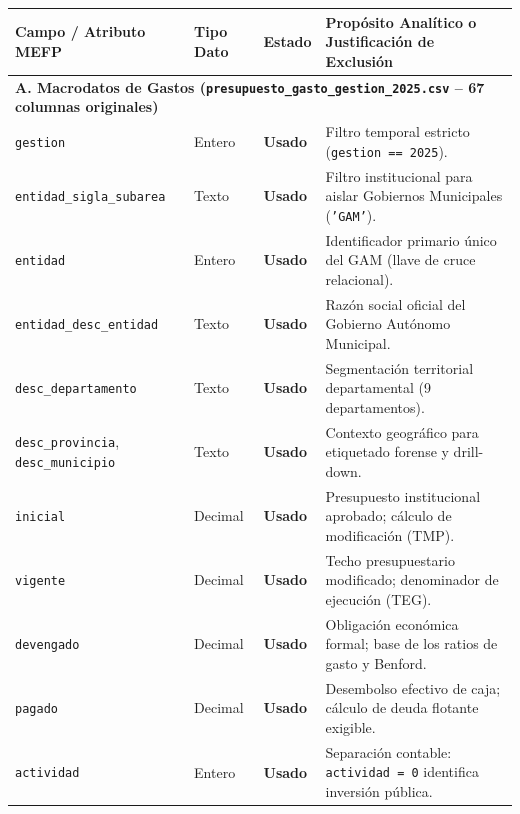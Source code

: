 
\begin{table}[H]
\centering
\scriptsize
\begin{tabularx}{\textwidth}{p{3.2cm}p{1.6cm}p{1.4cm}>{\raggedright\arraybackslash}X}
\toprule
\textbf{Campo / Atributo MEFP} & \textbf{Tipo Dato} & \textbf{Estado} & \textbf{Propósito Analítico o Justificación de Exclusión} \\
\midrule
\multicolumn{4}{l}{\textbf{A. Macrodatos de Gastos (\texttt{presupuesto\_gasto\_gestion\_2025.csv} -- 67 columnas originales)}} \\
\midrule
\texttt{gestion} & Entero & \textbf{Usado} & Filtro temporal estricto (\texttt{gestion == 2025}). \\
\texttt{entidad\_sigla\_subarea} & Texto & \textbf{Usado} & Filtro institucional para aislar Gobiernos Municipales (\texttt{'GAM'}). \\
\texttt{entidad} & Entero & \textbf{Usado} & Identificador primario único del GAM (llave de cruce relacional). \\
\texttt{entidad\_desc\_entidad} & Texto & \textbf{Usado} & Razón social oficial del Gobierno Autónomo Municipal. \\
\texttt{desc\_departamento} & Texto & \textbf{Usado} & Segmentación territorial departamental (9 departamentos). \\
\texttt{desc\_provincia}, \texttt{desc\_municipio} & Texto & \textbf{Usado} & Contexto geográfico para etiquetado forense y drill-down. \\
\texttt{inicial} & Decimal & \textbf{Usado} & Presupuesto institucional aprobado; cálculo de modificación (TMP). \\
\texttt{vigente} & Decimal & \textbf{Usado} & Techo presupuestario modificado; denominador de ejecución (TEG). \\
\texttt{devengado} & Decimal & \textbf{Usado} & Obligación económica formal; base de los ratios de gasto y Benford. \\
\texttt{pagado} & Decimal & \textbf{Usado} & Desembolso efectivo de caja; cálculo de deuda flotante exigible. \\
\texttt{actividad} & Entero & \textbf{Usado} & Separación contable: \texttt{actividad = 0} identifica inversión pública. \\

\end{tabularx}
\end{table}
